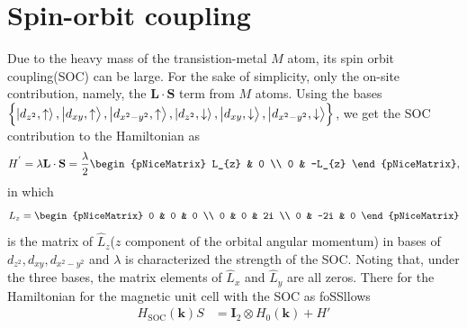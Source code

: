 \documentclass{report}
\newcommand{\f}[2]{\dfrac{#1}{#2}}
\begin{document}
\section{Spin-orbit coupling}
Due to the heavy mass of the transistion-metal $M$ atom, its spin orbit coupling(SOC) can be large. For the sake of simplicity, only the on-site contribution, namely, the $\mathbf{L \cdot S}$ term from $M$ atoms. Using the bases $\left\{\ket{d_{z^{2}},\uparrow},\ket{d_{xy},\uparrow},\ket{d_{x^{2} - y^{2}},\uparrow},\ket{d_{z^{2}},\downarrow},\ket{d_{xy},\downarrow},\ket{d_{x^{2} - y^{2} },\downarrow}\right\}$, we get the SOC contribution to the Hamiltonian as
\begin{gather}
	H^{'}
	= \lambda \mathbf{L \cdot S}
	= \f{\lambda}{2}
	\begin{pNiceMatrix}
		L_{z} & 0      \\
		0     & -L_{z}
	\end{pNiceMatrix},
\end{gather}
in which
\begin{gather}
	L_{z}
	=
	\begin{pNiceMatrix}
		0 & 0   & 0  \\
		0 & 0   & 2i \\
		0 & -2i & 0
	\end{pNiceMatrix}
\end{gather}
is the matrix of $\hat{L}_{z}$($z$ component of the orbital angular momentum) in bases of $d_{z^{2}},d_{xy},d_{x^{2} - y^{2}}$ and $\lambda$ is characterized the strength of the SOC. Noting that, under the three bases, the matrix elements of $\hat{L}_{x}$ and $\hat{L}_{y}$ are all zeros. There for the Hamiltonian for the magnetic unit cell with the SOC as foSSllows
\begin{equation}
	\begin{aligned}
		H_{\text{SOC}}(\mathbf{k})S
		 & = \mathbf{I}_{2} \otimes H_{0}(\mathbf{k}) + H'
	\end{aligned}
\end{equation}
\end{document}

